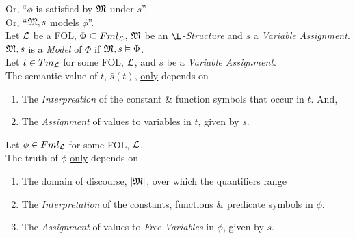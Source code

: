 \documentclass[11pt,a4paper]{article}
\begin{document}
Or, ``$\phi$ is satisfied by $\mathfrak{M}$ under $s$''.\\
Or, ``$\mathfrak{M},s$ models $\phi$''.\\

Let $\mathcal{L}$ be a FOL, $\Phi\subseteq Fml_{\mathcal{L}}$, $\mathfrak{M}$ be an \textit{$\L$-Structure} and $s$ a \textit{Variable Assignment}.\\
$\mathfrak{M},s$ is a \textit{Model} of $\Phi$ if $\mathfrak{M},s\vDash\Phi$.\\

Let $t\in Tm_{\mathcal{L}}$ for some FOL, $\mathcal{L}$, and $s$ be a \textit{Variable Assignment}.\\
The semantic value of $t$, $\bar{s}(t)$, \underline{only} depends on
\begin{enumerate}
	\item The \textit{Interpreation} of the constant \& function symbols that occur in $t$. And,
	\item The \textit{Assignment} of values to variables in $t$, given by $s$.
\end{enumerate}

Let $\phi\in Fml_{\mathcal{L}}$ for some FOL, $\mathcal{L}$.\\
The truth of $\phi$ \underline{only} depends on
\begin{enumerate}
	\item The domain of discourse, $|\mathfrak{M}|$, over which the quantifiers range %
	\item The \textit{Interpretation} of the constants, functions \& predicate symbols in $\phi$.
	\item The \textit{Assignment} of values to \textit{Free Variables} in $\phi$, given by $s$.
\end{enumerate}
\end{document}
